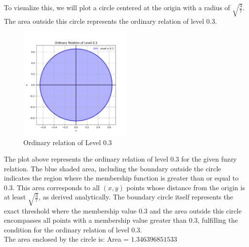 To visualize this, we will plot a circle centered at the origin with a radius of 
$\sqrt{\frac{3}{7}}$.​
The area outside this circle represents the ordinary relation of level 
$0.3$.
\begin{figure}[H]
	\centering
	\includegraphics[width=0.5\textwidth]{../Problem 8/ordinary_plot.pdf}
	\caption{Ordinary relation of Level $0.3$}
\end{figure}
The plot above represents the ordinary relation of level $0.3$ for the given fuzzy relation. The blue shaded area, including the boundary outside the circle indicates the region where the membership function is greater than or equal to 0.3. This area corresponds to all $(x,y)$ points whose distance from the origin is at least $\sqrt{\frac{3}{7}}$, as derived analytically. The boundary circle itself represents the exact threshold where the membership value $0.3$ and the area outside this circle encompasses all points with a membership value greater than $0.3$, fulfilling the condition for the ordinary relation of level 0.3. 
\\
The area enclosed by the circle is: Area = $1.346396851533$
\vspace{3mm}
